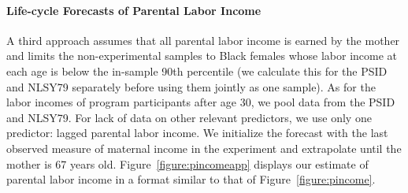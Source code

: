 \paragraph{Life-cycle Forecasts of Parental Labor Income} \label{appendix:lcyclepincome}

\noindent A third approach assumes that all parental labor income is earned by the mother and limits the non-experimental samples to Black females whose labor income at each age is below the in-sample 90th percentile (we calculate this for the PSID and NLSY79 separately before using them jointly as one sample). As for the labor incomes of program participants after age 30, we pool data from the PSID and NLSY79. For lack of data on other relevant predictors, we use only one predictor: lagged parental labor income. We initialize the forecast with the last observed measure of maternal income in the experiment and extrapolate until the mother is 67 years old. Figure~\ref{figure:pincomeapp} displays our estimate of parental labor income in a format similar to that of Figure~\ref{figure:pincome}.\\



